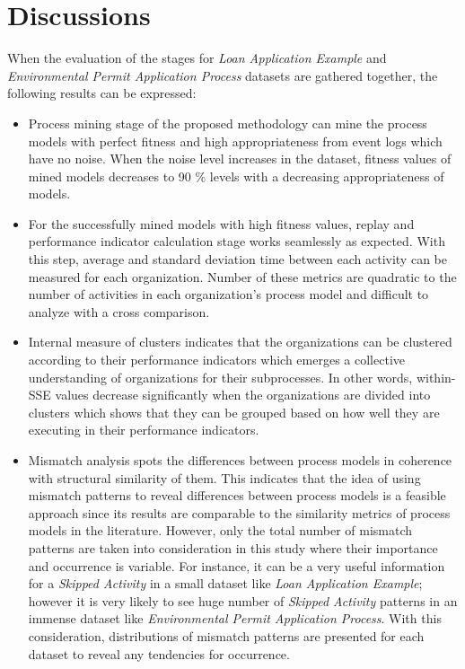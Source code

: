 


\section{Discussions}
\label{sec:discussions}
When the evaluation of the stages for \textit{Loan Application Example} and \textit{Environmental Permit Application Process} datasets are gathered together, the following results can be expressed:

\begin{itemize}
	\item Process mining stage of the proposed methodology can mine the process models with perfect fitness and high appropriateness from event logs which have no noise. When the noise level increases in the dataset, fitness values of mined models decreases to 90 \% levels with a decreasing appropriateness of models.
	\item For the successfully mined models with high fitness values, replay and performance indicator calculation stage works seamlessly as expected. With this step, average and standard deviation time between each activity can be measured for each organization. Number of these metrics are quadratic to the number of activities in each organization's process model and difficult to analyze with a cross comparison.
	\item Internal measure of clusters indicates that the organizations can be clustered according to their performance indicators which emerges a collective understanding of organizations for their subprocesses. In other words, within-SSE values decrease significantly when the organizations are divided into clusters which shows that they can be grouped based on how well they are executing in their performance indicators.
	\item Mismatch analysis spots the differences between process models in coherence with structural similarity of them. This indicates that the idea of using mismatch patterns to reveal differences between process models is a feasible approach since its results are comparable to the similarity metrics of process models in the literature. However, only the total number of mismatch patterns are taken into consideration in this study where their importance and occurrence is variable. For instance, it can be a very useful information for a \textit{Skipped Activity} in a small dataset like \textit{Loan Application Example}; however it is very likely to see huge number of \textit{Skipped Activity} patterns in an immense dataset like \textit{Environmental Permit Application Process}. With this consideration, distributions of mismatch patterns are presented for each dataset to reveal any tendencies for occurrence. 

\end{itemize}
